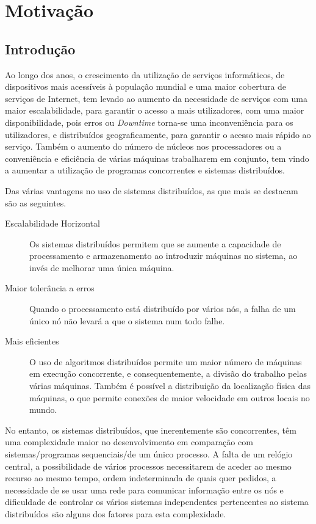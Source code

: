 \chapter{Motivação}
\label{chap:motivacao}

\section{Introdução}
\label{motivacao:sec:introducao}



Ao longo dos anos, o crescimento da utilização de serviços informáticos, de dispositivos mais acessíveis à população mundial e uma maior cobertura de serviços de Internet, 
tem levado ao aumento da necessidade de serviços com uma maior escalabilidade, para garantir o acesso a mais utilizadores, com uma maior disponibilidade, pois erros ou \emph{Downtime} torna-se uma inconveniência para os utilizadores,
e distribuídos geograficamente, para garantir o acesso mais rápido ao serviço.
Também o aumento do número de núcleos nos processadores ou a conveniência e eficiência de várias máquinas trabalharem em conjunto, tem vindo a aumentar a utilização de programas concorrentes e sistemas distribuídos.

Das várias vantagens no uso de sistemas distribuídos, as que mais se destacam são as seguintes.
\begin{description}
    \item [Escalabilidade Horizontal] Os sistemas distribuídos permitem que se aumente a capacidade de processamento
	e armazenamento ao introduzir máquinas no sistema, ao invés de melhorar uma única máquina.
	
    \item [Maior tolerância a erros]Quando o processamento está distribuído por vários nós, a falha de um único nó não levará a que o sistema num todo falhe.

    \item [Mais eficientes] O uso de algoritmos distribuídos permite um maior número de máquinas em execução concorrente, e consequentemente, a divisão do trabalho pelas várias máquinas.
	Também é possível a distribuição da localização física das máquinas, o que permite conexões de maior velocidade em outros locais no mundo.

\end{description}

No entanto, os sistemas distribuídos, que inerentemente são concorrentes,
têm uma complexidade maior no desenvolvimento em comparação com sistemas/programas sequenciais/de um único processo.
A falta de um relógio central,
a possibilidade de vários processos necessitarem de aceder ao mesmo recurso ao mesmo tempo,
ordem indeterminada de quais quer pedidos,
a necessidade de se usar uma rede para comunicar informação entre os nós e dificuldade de controlar 
os vários sistemas independentes pertencentes ao sistema distribuídos são alguns dos fatores para esta complexidade.

